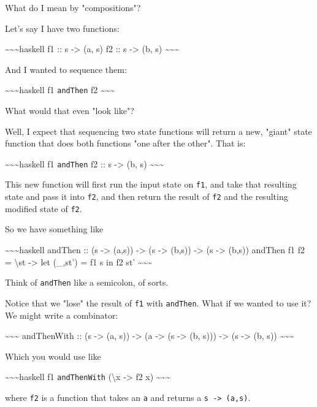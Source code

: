 \documentclass[]{article}
\begin{document}
What do I mean by "compositions"?

Let's say I have two functions:

\textasciitilde{}\textasciitilde{}\textasciitilde{}haskell f1 :: s
-\textgreater{} (a, s) f2 :: s -\textgreater{} (b, s)
\textasciitilde{}\textasciitilde{}\textasciitilde{}

And I wanted to sequence them:

\textasciitilde{}\textasciitilde{}\textasciitilde{}haskell f1 \texttt{andThen}
f2 \textasciitilde{}\textasciitilde{}\textasciitilde{}

What would that even "look like"?

Well, I expect that sequencing two state functions will return a new, "giant"
state function that does both functions "one after the other". That is:

\textasciitilde{}\textasciitilde{}\textasciitilde{}haskell f1 \texttt{andThen}
f2 :: s -\textgreater{} (b, s)
\textasciitilde{}\textasciitilde{}\textasciitilde{}

This new function will first run the input state on \texttt{f1}, and take that
resulting state and pass it into \texttt{f2}, and then return the result of
\texttt{f2} and the resulting modified state of \texttt{f2}.

So we have something like

\textasciitilde{}\textasciitilde{}\textasciitilde{}haskell andThen :: (s
-\textgreater{} (a,s)) -\textgreater{} (s -\textgreater{} (b,s)) -\textgreater{}
(s -\textgreater{} (b,s)) andThen f1 f2 = \textbackslash{}st -\textgreater{} let
(\_,st') = f1 s in f2 st' \textasciitilde{}\textasciitilde{}\textasciitilde{}

Think of \texttt{andThen} like a semicolon, of sorts.

Notice that we "lose" the result of \texttt{f1} with \texttt{andThen}. What if
we wanted to use it? We might write a combinator:

\textasciitilde{}\textasciitilde{}\textasciitilde{} andThenWith :: (s
-\textgreater{} (a, s)) -\textgreater{} (a -\textgreater{} (s -\textgreater{}
(b, s))) -\textgreater{} (s -\textgreater{} (b, s))
\textasciitilde{}\textasciitilde{}\textasciitilde{}

Which you would use like

\textasciitilde{}\textasciitilde{}\textasciitilde{}haskell f1
\texttt{andThenWith} (\textbackslash{}x -\textgreater{} f2 x)
\textasciitilde{}\textasciitilde{}\textasciitilde{}

where \texttt{f2} is a function that takes an \texttt{a} and returns a
\texttt{s\ -\textgreater{}\ (a,s)}.
\end{document}
